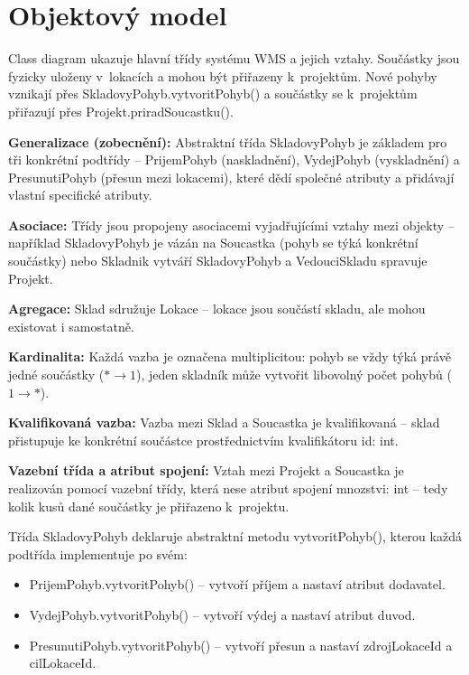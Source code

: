 \newpage
\chapter{Objektový model}

Class diagram ukazuje hlavní třídy systému WMS a jejich vztahy.
Součástky jsou fyzicky uloženy v~lokacích a mohou být přiřazeny k~projektům.
Nové pohyby vznikají přes SkladovyPohyb.vytvoritPohyb() a součástky se k~projektům přiřazují přes Projekt.priradSoucastku().

\textbf{Generalizace (zobecnění):} Abstraktní třída SkladovyPohyb je základem pro tři konkrétní podtřídy --
PrijemPohyb (naskladnění), VydejPohyb (vyskladnění) a PresunutiPohyb (přesun mezi lokacemi),
které dědí společné atributy a přidávají vlastní specifické atributy.

\textbf{Asociace:} Třídy jsou propojeny asociacemi vyjadřujícími vztahy mezi objekty --
například SkladovyPohyb je vázán na Soucastka (pohyb se týká konkrétní součástky)
nebo Skladnik vytváří SkladovyPohyb a VedouciSkladu spravuje Projekt.

\textbf{Agregace:} Sklad sdružuje Lokace -- lokace jsou součástí skladu, ale mohou existovat i samostatně.

\textbf{Kardinalita:} Každá vazba je označena multiplicitou: pohyb se vždy týká právě jedné součástky
($* \rightarrow 1$), jeden skladník může vytvořit libovolný počet pohybů ($1 \rightarrow *$).

\textbf{Kvalifikovaná vazba:} Vazba mezi Sklad a Soucastka je kvalifikovaná -- sklad přistupuje
ke konkrétní součástce prostřednictvím kvalifikátoru id: int.

\textbf{Vazební třída a atribut spojení:} Vztah mezi Projekt a Soucastka je realizován
pomocí vazební třídy, která nese atribut spojení mnozstvi: int --
tedy kolik kusů dané součástky je přiřazeno k~projektu.

Třída SkladovyPohyb deklaruje abstraktní metodu vytvoritPohyb(), kterou každá podtřída implementuje po svém:
\begin{itemize}
  \item PrijemPohyb.vytvoritPohyb() -- vytvoří příjem a nastaví atribut dodavatel.
  \item VydejPohyb.vytvoritPohyb() -- vytvoří výdej a nastaví atribut duvod.
  \item PresunutiPohyb.vytvoritPohyb() -- vytvoří přesun a nastaví zdrojLokaceId a cilLokaceId.
\end{itemize}

